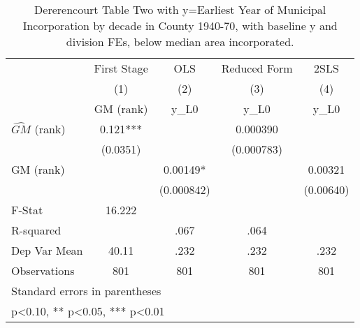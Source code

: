 \begin{table}[htbp]\centering
\def\sym#1{\ifmmode^{#1}\else\(^{#1}\)\fi}
\caption{Dererencourt Table Two with y=Earliest Year of Municipal Incorporation by decade in County 1940-70, with baseline y and division FEs, below median area incorporated.}
\begin{tabular}{l*{4}{c}}
\toprule
                    & First Stage   &         OLS   &Reduced Form   &        2SLS   \\
                    &\multicolumn{1}{c}{(1)}&\multicolumn{1}{c}{(2)}&\multicolumn{1}{c}{(3)}&\multicolumn{1}{c}{(4)}\\
                    &\multicolumn{1}{c}{GM  (rank)}&\multicolumn{1}{c}{y\_L0}&\multicolumn{1}{c}{y\_L0}&\multicolumn{1}{c}{y\_L0}\\
\midrule
$\hat{GM}$ (rank)   &       0.121***&               &    0.000390   &               \\
                    &    (0.0351)   &               &  (0.000783)   &               \\
\addlinespace
GM  (rank)          &               &     0.00149*  &               &     0.00321   \\
                    &               &  (0.000842)   &               &   (0.00640)   \\
\midrule
F-Stat              &      16.222   &               &               &               \\
R-squared           &               &        .067   &        .064   &               \\
Dep Var Mean        &       40.11   &        .232   &        .232   &        .232   \\
Observations        &         801   &         801   &         801   &         801   \\
\bottomrule
\multicolumn{5}{l}{\footnotesize Standard errors in parentheses}\\
\multicolumn{5}{l}{\footnotesize * p<0.10, ** p<0.05, *** p<0.01}\\
\end{tabular}
\end{table}
